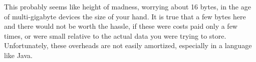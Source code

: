 This probably seems like height of madness, worrying about 16 bytes, in the age
of multi-gigabyte devices the size of your hand. It is true that a few bytes
here and there would not be worth the hassle, if these were costs paid only a
few times, or were small relative to the actual data you were trying to store.
Unfortunately, these overheads are not easily amortized, especially in a
language like Java.








\begin{comment}
After all, Java provides you with automatic garbage collection, and there are
lots of libraries and frameworks available, written by experts, that provide
powerful functionality. All you have to do is piece together the parts and let
the Java runtime system do the rest for you.

The reality, unfortunately, is very different. If you just assemble the parts, take
the defaults, and follow all the good advice to make your
program flexible and maintainable, you will likely find that your memory needs are
\emph{much} higher than imagined. You may also find that precious memory
resources are wasted holding on to data that is no longer needed, or, even
worse, that your system suffers from memory leaks. All too often, these problems
won't show up until late in the cycle, when the whole system comes together. 
You may discover, for example, when your product is about to ship, that your design is
far from fitting into memory, or that it does not support nearly the number
of users it needs to support. Fixing these problems can
take a major effort, requiring extensive refactoring or rethinking
architectural decisions, such as the choice of frameworks you use.
\end{comment}

